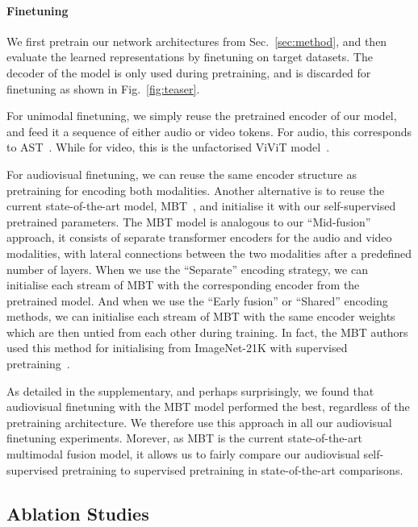 \documentclass[10pt,twocolumn,letterpaper]{article}
\def \paravspace {-1\baselineskip}
\begin{document}
\vspace{\paravspace}
\paragraph{Finetuning}
We first pretrain our network architectures from Sec.~\ref{sec:method}, and then evaluate the learned representations by finetuning on target datasets.
The decoder of the model is only used during pretraining, and is discarded for finetuning as shown in Fig.~\ref{fig:teaser}.


For unimodal finetuning, we simply reuse the pretrained encoder of our model, and feed it a sequence of either audio or video tokens.
For audio, this corresponds to AST~\cite{gong2021ast}.
While for video, this is the unfactorised ViViT model~\cite{arnab2021vivit}.

For audiovisual finetuning, we can reuse the same encoder structure as pretraining for encoding both modalities.
Another alternative is to reuse the current state-of-the-art model, MBT~\cite{nagrani2021attention}, and initialise it with our self-supervised pretrained parameters. The MBT model is analogous to our ``Mid-fusion'' approach, it consists of separate transformer encoders for the audio and video modalities, with lateral connections between the two modalities after a predefined number of layers.
When we use the ``Separate'' encoding strategy, we can initialise each stream of MBT with the corresponding encoder from the pretrained model.
And when we use the ``Early fusion'' or ``Shared'' encoding methods, we can initialise each stream of MBT with the same encoder weights which are then untied from each other during training.
In fact, the MBT authors used this method for initialising from ImageNet-21K with supervised pretraining~\cite{nagrani2021attention}.

As detailed in the supplementary, and perhaps surprisingly, we found that audiovisual finetuning with the MBT model performed the best, regardless of the pretraining architecture.
We therefore use this approach in all our audiovisual finetuning experiments.
Morever, as MBT is the current state-of-the-art multimodal fusion model, it allows us to fairly compare our audiovisual self-supervised pretraining to supervised pretraining in state-of-the-art comparisons.


\subsection{Ablation Studies}
\label{sec:exp_ablations}
\vspace{-1mm}
\end{document}
